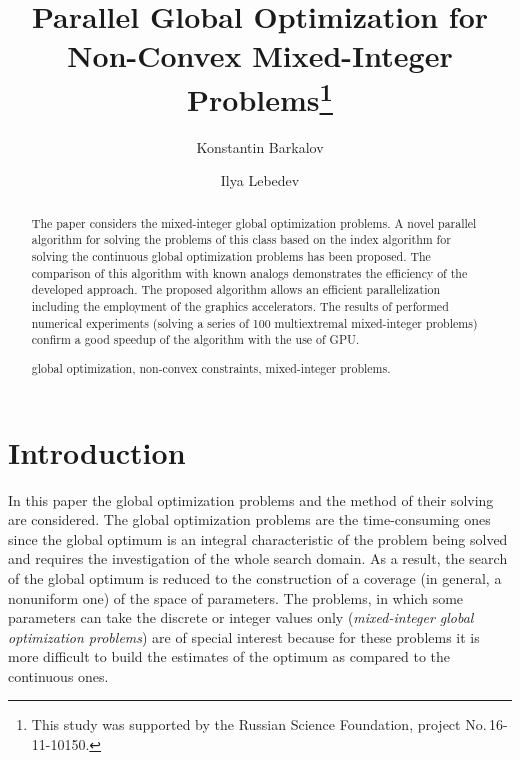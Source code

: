 \documentclass{llncs}
\begin{document}
\mainmatter 

\title{Parallel Global Optimization for Non-Convex Mixed-Integer Problems\thanks{This study was supported by the Russian Science Foundation, project No.\,16-11-10150.}}
\author{Konstantin Barkalov \and Ilya Lebedev %
\\
}


\maketitle

\begin{abstract}

The paper considers the mixed-integer global optimization problems. A novel 
parallel algorithm for solving the problems of this class based on the index 
algorithm for solving the continuous global optimization problems has been proposed. 
The comparison of this algorithm with known analogs demonstrates the efficiency of the 
developed approach. 
The proposed algorithm allows an efficient parallelization including the employment of the 
graphics accelerators. The results of performed numerical experiments (solving a series of 100 multiextremal mixed-integer problems) confirm a good speedup of the algorithm with the use of GPU. 

\keywords global optimization, non-convex constraints, mixed-integer problems.

\end{abstract}

\section{Introduction}\label{sec:intro}

In this paper the global optimization problems and the method of their solving are 
considered. The global optimization problems are the time-consuming ones since the global 
optimum is an integral characteristic of the problem being solved and requires the investigation 
of the whole search domain. 
As a result, the search of the global optimum is reduced to the construction of a coverage (in 
general, a nonuniform one) of the space of parameters. 
The problems, in which some parameters can take the discrete or integer values only (\textit{mixed-integer global 
optimization problems}) are of special interest because for these problems it is more difficult to build 
the estimates of the optimum as compared to the continuous ones.
\end{document}
